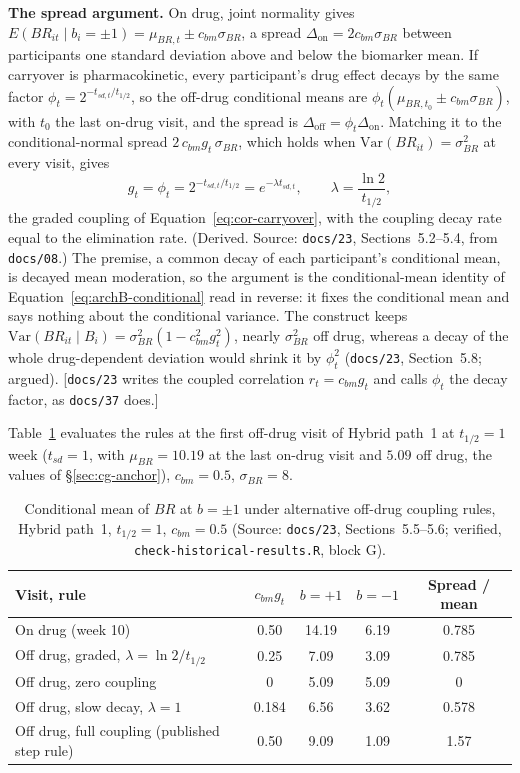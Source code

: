\documentclass[11pt]{article}
\newcommand{\note}[1]{\textcolor{blue!60!black}{\small [#1]}}
\newcommand{\code}[1]{\texttt{#1}}
\begin{document}
\textbf{The spread argument.} On drug, joint normality gives
$E(BR_{it} \mid b_i = \pm1) = \mu_{BR,t} \pm c_{bm}\sigma_{BR}$, a
spread $\Delta_{\mathrm{on}} = 2c_{bm}\sigma_{BR}$ between participants
one standard deviation above and below the biomarker mean. If carryover
is pharmacokinetic, every participant's drug effect decays by the same
factor $\phi_t = 2^{-t_{sd,t}/t_{1/2}}$, so the off-drug conditional
means are $\phi_t(\mu_{BR,t_0} \pm c_{bm}\sigma_{BR})$, with $t_0$ the
last on-drug visit, and the spread is
$\Delta_{\mathrm{off}} = \phi_t\Delta_{\mathrm{on}}$. Matching it to the
conditional-normal spread $2\,c_{bm}g_t\,\sigma_{BR}$, which holds when
$\mathrm{Var}(BR_{it}) = \sigma_{BR}^2$ at every visit, gives
\begin{equation}
g_t = \phi_t = 2^{-t_{sd,t}/t_{1/2}} = e^{-\lambda t_{sd,t}},
\qquad \lambda = \frac{\ln 2}{t_{1/2}},
\label{eq:inva-pk}
\end{equation}
the graded coupling of Equation~\eqref{eq:cor-carryover}, with the
coupling decay rate equal to the elimination rate. (Derived. Source:
\code{docs/23}, Sections~5.2--5.4, from \code{docs/08}.) The premise,
a common decay of each participant's conditional mean, is decayed mean
moderation, so the argument is the conditional-mean identity of
Equation~\eqref{eq:archB-conditional} read in reverse: it fixes the conditional
mean and says nothing about the conditional variance. The construct
keeps $\mathrm{Var}(BR_{it} \mid B_i) = \sigma_{BR}^2(1 - c_{bm}^2g_t^2)$,
nearly $\sigma_{BR}^2$ off drug, whereas a decay of the whole
drug-dependent deviation would shrink it by $\phi_t^2$ (\code{docs/23},
Section~5.8; argued). \note{\code{docs/23} writes the coupled
correlation $r_t = c_{bm}g_t$ and calls $\phi_t$ the decay factor, as
\code{docs/37} does.}

Table~\ref{tab:inva-pk} evaluates the rules at the first off-drug
visit of Hybrid path~1 at $t_{1/2} = 1$ week ($t_{sd} = 1$, with
$\mu_{BR} = 10.19$ at the last on-drug visit and $5.09$ off drug, the
values of \S\ref{sec:cg-anchor}), $c_{bm} = 0.5$, $\sigma_{BR} = 8$.

\begin{table}[h]
\centering\small
\caption{Conditional mean of $BR$ at $b = \pm1$ under alternative
off-drug coupling rules, Hybrid path~1, $t_{1/2} = 1$, $c_{bm} = 0.5$
(Source: \code{docs/23}, Sections~5.5--5.6; verified,
\code{check-historical-results.R}, block G).}
\label{tab:inva-pk}
\begin{tabular}{@{}lcccc@{}}
\toprule
Visit, rule & $c_{bm}g_t$ & $b = +1$ & $b = -1$ & Spread / mean \\
\midrule
On drug (week 10) & 0.50 & 14.19 & 6.19 & 0.785 \\
Off drug, graded, $\lambda = \ln 2/t_{1/2}$ & 0.25 & 7.09 & 3.09 & 0.785 \\
Off drug, zero coupling & 0 & 5.09 & 5.09 & 0 \\
Off drug, slow decay, $\lambda = 1$ & 0.184 & 6.56 & 3.62 & 0.578 \\
Off drug, full coupling (published step rule) & 0.50 & 9.09 & 1.09 & 1.57 \\
\bottomrule
\end{tabular}
\end{table}
\end{document}
